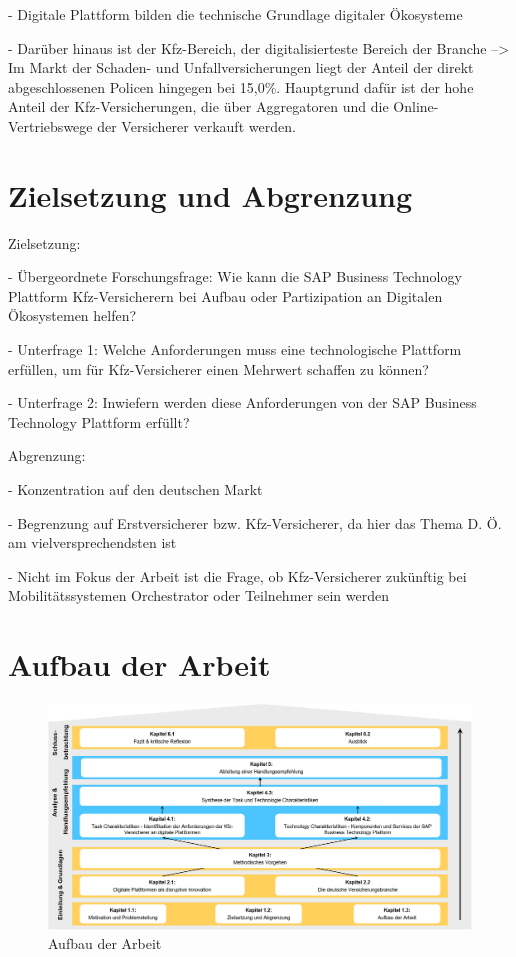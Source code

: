 -	Digitale Plattform bilden die technische Grundlage digitaler Ökosysteme

-	Darüber hinaus ist der Kfz-Bereich, der digitalisierteste Bereich der Branche --> Im Markt der Schaden- und Unfallversicherungen liegt der Anteil der direkt abgeschlossenen Policen hingegen bei 15,0\%. Hauptgrund dafür ist der hohe Anteil der Kfz-Versicherungen, die über Aggregatoren und die Online-Vertriebswege der Versicherer verkauft werden.










\newpage
\section{Zielsetzung und Abgrenzung}

Zielsetzung:

-	Übergeordnete Forschungsfrage: Wie kann die SAP Business Technology Plattform Kfz-Versicherern bei Aufbau oder Partizipation an Digitalen Ökosystemen helfen?

-	Unterfrage 1: Welche Anforderungen muss eine technologische Plattform erfüllen, um für Kfz-Versicherer einen Mehrwert schaffen zu können?

-	Unterfrage 2: Inwiefern werden diese Anforderungen von der SAP Business Technology Plattform erfüllt?


Abgrenzung:

-	Konzentration auf den deutschen Markt

-	Begrenzung auf Erstversicherer bzw. Kfz-Versicherer, da hier das Thema D. Ö. am vielversprechendsten ist

-	Nicht im Fokus der Arbeit ist die Frage, ob Kfz-Versicherer zukünftig bei Mobilitätssystemen Orchestrator oder Teilnehmer sein werden


\newpage
\section{Aufbau der Arbeit}

\begin{figure}[h]
    \centering
    \includegraphics[width=1\textwidth]{img/Aufbau_der_Arbeit.jpg}
    \caption[Aufbau der Arbeit]{Aufbau der Arbeit\autocite{Aufbau}}
    \label{fig:Aufbau}
\end{figure}

\newpage